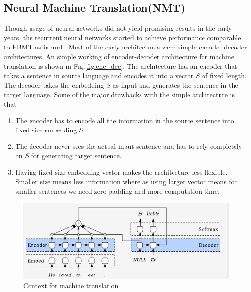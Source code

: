 \documentclass[conference]{IEEEtran}
\begin{document}
\subsection{Neural Machine Translation(NMT)}
Though usage of neural networks did not yield promising results in the early years, the recurrent neural networks started to achieve performance comparable to PBMT as in \cite{kalchbrenner2013recurrent} and \cite{hermann2013multilingual}. Most of the early architectures were simple encoder-decoder architectures. An simple working of encoder-decoder architecture for machine translation is shown in Fig.\ref{fig:enc_dec}. The architecture has an encoder that takes a sentence in source language and encodes it into a vector $S$ of fixed length. The decoder takes the embedding $S$ as input and generates the sentence in the target language. Some of the major drawbacks with the simple architecture is that
\begin{enumerate}
 \item The encoder has to encode all the information in the source sentence into fixed size embedding $S$. 
 \item The decoder never sees the actual input sentence and has to rely completely on $S$ for generating target sentence. 
 \item Having fixed size embedding vector makes the architecture less flexible. Smaller size means less information where as using larger vector means for smaller sentences we need zero padding and more computation time.
\end{enumerate}


\begin{figure}
    \includegraphics[width=.99\linewidth]{img/context.png}  
    \caption{Context for machine translation} 
    \label{fig:context}
\end{figure}
\end{document}
